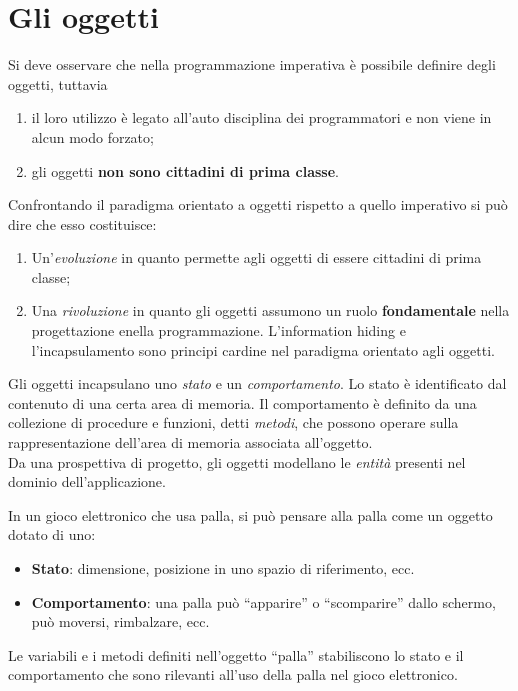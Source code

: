 \documentclass[12pt]{report}
\begin{document}
\section{Gli oggetti}
Si deve osservare che nella programmazione imperativa è possibile definire degli oggetti, tuttavia
\begin{enumerate}
	\item il loro utilizzo è legato all'auto disciplina dei programmatori e non viene in alcun modo forzato;
	\item gli oggetti \textbf{non sono cittadini di prima classe}.
\end{enumerate}
Confrontando il paradigma orientato a oggetti rispetto a quello imperativo si può dire che esso costituisce:
\begin{enumerate}
	\item Un'\textit{evoluzione} in quanto permette agli oggetti di essere cittadini di prima classe;
	\item Una \textit{rivoluzione} in quanto gli oggetti assumono un ruolo \textbf{fondamentale} nella progettazione enella programmazione. L'information hiding e l'incapsulamento sono principi cardine nel paradigma orientato agli oggetti.
\end{enumerate}
Gli oggetti incapsulano uno \textit{stato} e un \textit{comportamento}. Lo stato è identificato dal contenuto di una certa area di memoria. Il comportamento è definito da una collezione di procedure e funzioni, detti \textit{metodi}, che possono operare sulla rappresentazione dell'area di memoria associata all'oggetto. \\
Da una prospettiva di progetto, gli oggetti modellano le \textit{entità} presenti nel dominio dell'applicazione.
\begin{example}{}{}
	In un gioco elettronico che usa palla, si può pensare alla palla come un oggetto dotato di uno:
	\begin{itemize}
		\item \textbf{Stato}: dimensione, posizione in uno spazio di riferimento, ecc.
		\item \textbf{Comportamento}: una palla può ``apparire'' o  ``scomparire'' dallo schermo, può moversi, rimbalzare, ecc.
	\end{itemize}
	Le variabili e i metodi definiti nell'oggetto ``palla'' stabiliscono lo stato e il comportamento che sono rilevanti all'uso della palla nel gioco elettronico.
\end{example}
\end{document}
